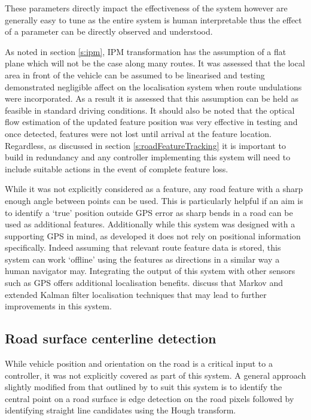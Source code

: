 \documentclass[]{aiaa-tc}%
\begin{document}
These parameters directly impact the effectiveness of the system however are generally easy to tune as the entire system is human interpretable thus the effect of a parameter can be directly observed and understood.

As noted in section \ref{s:ipm}, IPM transformation has the assumption of a flat plane which will not be the case along many routes. It was assessed that the local area in front of the vehicle can be assumed to be linearised and testing demonstrated negligible affect on the localisation system when route undulations were incorporated. As a result it is assessed that this assumption can be held as feasible in standard driving conditions. It should also be noted that the optical flow estimation of the updated feature position was very effective in testing and once detected, features were not lost until arrival at the feature location. Regardless, as discussed in section \ref{s:roadFeatureTracking} it is important to build in redundancy and any controller implementing this system will need to include suitable actions in the event of complete feature loss.

While it was not explicitly considered as a feature, any road feature with a sharp enough angle between points can be used. This is particularly helpful if an aim is to identify a `true' position outside GPS error as sharp bends in a road can be used as additional features. Additionally while this system was designed with a supporting GPS in mind, as developed it does not rely on positional information specifically. Indeed assuming that relevant route feature data is stored, this system can work `offline' using the features as directions in a similar way a human navigator may. Integrating the output of this system with other sensors such as GPS offers additional localisation benefits. \citet{probabalisticRobotics} discuss that Markov and extended Kalman filter localisation techniques that may lead to further improvements in this system.



\subsection{Road surface centerline detection}

While vehicle position and orientation on the road is a critical input to a controller, it was not explicitly covered as part of this system. A general approach slightly modified from that outlined by \citet{canneyAndHoughLanes} to suit this system is to identify the central point on a road surface is edge detection on the road pixels followed by identifying straight line candidates using the Hough transform.  
\end{document}
